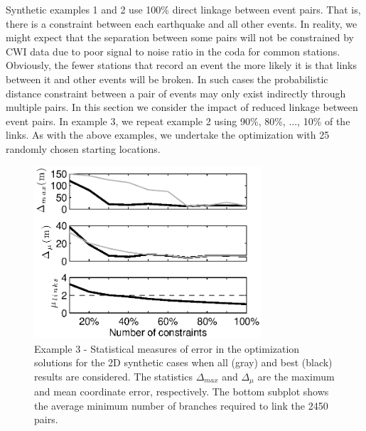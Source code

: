 \documentclass[extra, onecolumn, doublespacing]{gji}
\begin{document}
Synthetic examples 1 and 2 use 100\% direct linkage between event
pairs. That is, there is a constraint between each earthquake and
all other events. In reality, we might expect that the separation
between some pairs will not be constrained by CWI data due to poor
signal to noise ratio in the coda for common stations. Obviously,
the fewer stations that record an event the more likely it is that
links between it and other events will be broken. In such cases the
probabilistic distance constraint between a pair of events may only
exist indirectly through multiple pairs. In this section we consider
the impact of reduced linkage between event pairs. In example 3, we
repeat example 2 using 90\%, 80\%, ..., 10\% of the links. As with
the above examples, we undertake the optimization with 25 randomly
chosen starting locations.

\begin{figure}
\noindent\includegraphics[width =
20pc]{diags/synth2Dmulti/ressummary_2Dsynth50eq.eps}
\caption{Example 3 - Statistical measures of error in the
optimization solutions for the 2D synthetic cases when all (gray)
and best (black) results are considered. The statistics
$\Delta_{max}$ and $\Delta_\mu$  are the maximum and mean coordinate
error, respectively. The bottom subplot shows the average minimum
number of branches required to link the 2450 pairs.}
 \label{fig:optimisationresults-2Dsynth}
\end{figure}
\end{document}
